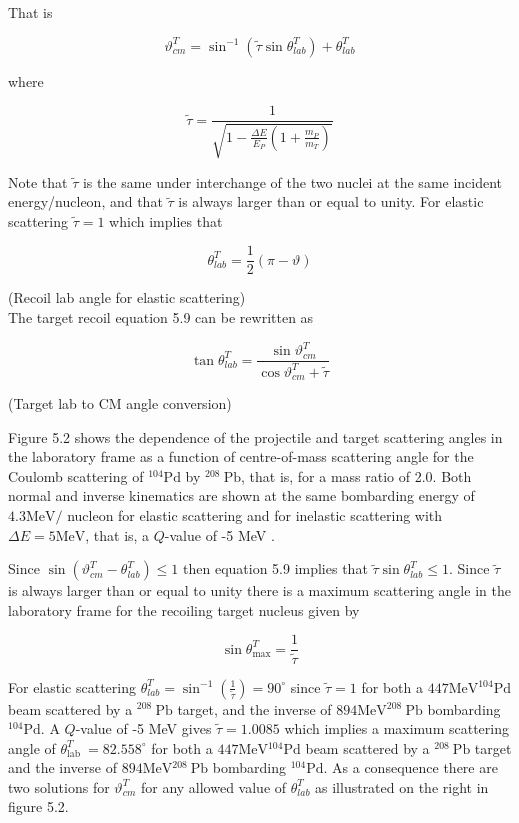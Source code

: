 \documentclass[10pt]{article}
\begin{document}
That is


\begin{equation*}
\vartheta_{c m}^{T}=\sin ^{-1}\left(\tilde{\tau} \sin \theta_{l a b}^{T}\right)+\theta_{l a b}^{T} \tag{5.10}
\end{equation*}


where


\begin{equation*}
\tilde{\tau}=\frac{1}{\sqrt{1-\frac{\Delta E}{E_{P}}\left(1+\frac{m_{P}}{m_{T}}\right)}} \tag{5.11}
\end{equation*}


Note that $\tilde{\tau}$ is the same under interchange of the two nuclei at the same incident energy/nucleon, and that $\tilde{\tau}$ is always larger than or equal to unity. For elastic scattering $\tilde{\tau}=1$ which implies that

$$
\theta_{l a b}^{T}=\frac{1}{2}(\pi-\vartheta)
$$

(Recoil lab angle for elastic scattering)\\
The target recoil equation 5.9 can be rewritten as

$$
\tan \theta_{l a b}^{T}=\frac{\sin \vartheta_{c m}^{T}}{\cos \vartheta_{c m}^{T}+\tilde{\tau}}
$$

(Target lab to CM angle conversion)

Figure 5.2 shows the dependence of the projectile and target scattering angles in the laboratory frame as a function of centre-of-mass scattering angle for the Coulomb scattering of ${ }^{104} \mathrm{Pd}$ by ${ }^{208} \mathrm{~Pb}$, that is, for a mass ratio of 2.0. Both normal and inverse kinematics are shown at the same bombarding energy of $4.3 \mathrm{MeV} /$ nucleon for elastic scattering and for inelastic scattering with $\Delta E=5 \mathrm{MeV}$, that is, a $Q$-value of -5 MeV .

Since $\sin \left(\vartheta_{c m}^{T}-\theta_{l a b}^{T}\right) \leq 1$ then equation 5.9 implies that $\tilde{\tau} \sin \theta_{l a b}^{T} \leq 1$. Since $\tilde{\tau}$ is always larger than or equal to unity there is a maximum scattering angle in the laboratory frame for the recoiling target nucleus given by


\begin{equation*}
\sin \theta_{\max }^{T}=\frac{1}{\tilde{\tau}} \tag{5.12}
\end{equation*}


For elastic scattering $\theta_{l a b}^{T}=\sin ^{-1}\left(\frac{1}{\tilde{\tau}}\right)=90^{\circ}$ since $\tilde{\tau}=1$ for both a $447 \mathrm{MeV}{ }^{104} \mathrm{Pd}$ beam scattered by a ${ }^{208} \mathrm{~Pb}$ target, and the inverse of $894 \mathrm{MeV}{ }^{208} \mathrm{~Pb}$ bombarding ${ }^{104} \mathrm{Pd}$. A $Q$-value of -5 MeV gives $\tilde{\tau}=1.0085$ which implies a maximum scattering angle of $\theta_{\text {lab }}^{T}=82.558^{\circ}$ for both a $447 \mathrm{MeV}{ }^{104} \mathrm{Pd}$ beam scattered by a ${ }^{208} \mathrm{~Pb}$ target and the inverse of $894 \mathrm{MeV}{ }^{208} \mathrm{~Pb}$ bombarding ${ }^{104} \mathrm{Pd}$. As a consequence there are two solutions for $\vartheta_{c m}^{T}$ for any allowed value of $\theta_{l a b}^{T}$ as illustrated on the right in figure 5.2.
\end{document}
